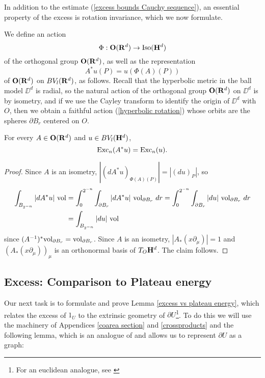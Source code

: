 In addition to the estimate (\ref{excess bounds Cauchy sequence}), an essential property of the excess is rotation invariance, which we now formulate.

\begin{notation}
We define an action
\begin{equation}\label{hyperbolic rotation}
    \Phi: \mathbf{O}(\mathbf{R}^d) \to \operatorname{Iso}(\mathbf H^d)
\end{equation}
of the orthogonal group $\mathbf{O}(\mathbf{R}^d)$, as well as the representation
$$A^* u(P) = u(\Phi(A)(P))$$
of $\mathbf{O}(\mathbf{R}^d)$ on $BV_l(\mathbf{R}^d)$, as follows.
Recall that the hyperbolic metric in the ball model $\DD^d$ is radial, so the natural action of the orthogonal group $\mathbf{O}(\mathbf{R}^d)$ on $\DD^d$ is by isometry, and if we use the Cayley transform to identify the origin of $\DD^d$ with $O$, then we obtain a faithful action (\ref{hyperbolic rotation}) whose orbits are the spheres $\partial B_r$ centered on $O$.
\end{notation}

\begin{lemma}\label{excess rotation invariant}
For every $A \in \mathbf{O}(\mathbf{R}^d)$ and $u \in BV_l(\mathbf H^d)$,
$$\operatorname{Exc}_n(A^* u) = \operatorname{Exc}_n(u).$$
\end{lemma}
\begin{proof}
Since $A$ is an isometry, $|(d A^* u)_{\Phi(A)(P)}| = |(du)_P|$, so
\begin{align*}
\int_{B_{2^{-n}}} |dA^*u| ~\mathrm{vol} &= \int_0^{2^{-n}} \int_{\partial B_r} |dA^* u| ~\mathrm{vol}_{\partial B_r} ~dr = \int_0^{2^{-n}} \int_{\partial B_r} |du| ~\mathrm{vol}_{\partial B_r} ~dr\\
&= \int_{B_{2^{-n}}} |du| ~\mathrm{vol}
\end{align*}
since $(A^{-1})^* \mathrm{vol}_{\partial B_r} = \mathrm{vol}_{\partial B_r}$.
Since $A$ is an isometry, $|A_* (x \partial_\mu)| = 1$ and $(A_*(x \partial_\mu))_\mu$ is an orthonormal basis of $T_O \mathbf H^d$.
The claim follows.
\end{proof}

\subsection{Excess: Comparison to Plateau energy}
Our next task is to formulate and prove Lemma \ref{excess vs plateau energy}, which relates the excess of $1_U$ to the extrinsic geometry of $\partial U$\footnote{For an euclidean analogue, see \cite[TODO]{Miranda66}}.
To do this we will use the machinery of Appendices \ref{coarea section} and \ref{crossproducts} and the following lemma, which is an analogue of \cite[Theorem 4.8]{Giusti77} and allows us to represent $\partial U$ as a graph:

